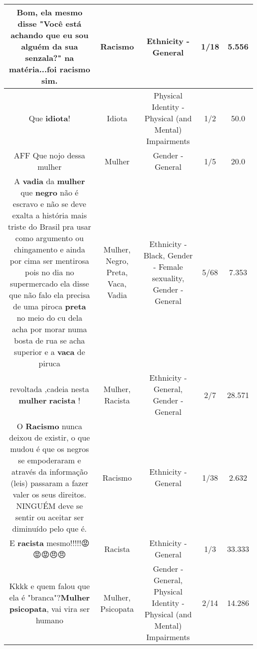 \documentclass[11pt]{article}
\newlength\mylength
\begin{document}
\begin{center}
\begin{longtable}{|C{.65\mylength}|C{.30\mylength}|C{.12\mylength}|C{.12\mylength}|C{.12\mylength}|}
  \small Bom, ela mesmo disse "Você está achando que eu sou alguém da sua senzala?" na matéria...foi \textbf{racismo} sim.\normalsize   & Racismo & Ethnicity - General & 1/18 & 5.556 \\  \hline
  \small Que \textbf{idiota}!\normalsize   & Idiota & Physical Identity - Physical (and Mental) Impairments & 1/2 & 50.0 \\  \hline
  \small AFF Que nojo dessa mulher\normalsize   & Mulher & Gender - General & 1/5 & 20.0 \\  \hline
  \small A \textbf{vadia} da \textbf{mulher} que \textbf{negro} não é escravo e não se deve exalta a história mais triste do Brasil pra usar como argumento ou chingamento  e ainda por cima ser mentirosa pois no dia no supermercado ela disse que não falo ela precisa de uma piroca \textbf{preta} no meio do cu dela acha por morar numa bosta de rua se acha superior e a \textbf{vaca} de piruca\normalsize   & Mulher, Negro, Preta, Vaca, Vadia & Ethnicity - Black, Gender - Female sexuality, Gender - General & 5/68 & 7.353 \\  \hline
  \small  revoltada ,cadeia nesta \textbf{mulher} \textbf{racista} !\normalsize   & Mulher, Racista & Ethnicity - General, Gender - General & 2/7 & 28.571 \\  \hline
  \small O \textbf{Racismo} nunca deixou de existir, o que mudou é que os negros se empoderaram e através da informação (leis) passaram a fazer valer os seus direitos. NINGUÉM deve se sentir ou aceitar ser diminuído pelo que é.\normalsize   & Racismo & Ethnicity - General & 1/38 & 2.632 \\  \hline
  \small E \textbf{racista} mesmo!!!!!😡😡😡😠😠\normalsize   & Racista & Ethnicity - General & 1/3 & 33.333 \\  \hline
  \small Kkkk e quem falou que ela é "branca"?\textbf{Mulher} \textbf{psicopata},  vai vira ser humano\normalsize   & Mulher, Psicopata & Gender - General, Physical Identity - Physical (and Mental) Impairments & 2/14 & 14.286 \\  \hline

\end{longtable}
\end{center}
\end{document}
